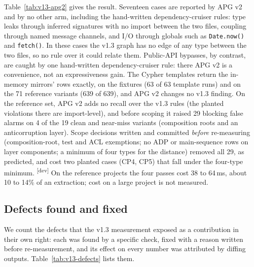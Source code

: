 \documentclass[10pt,a4paper]{article}
\newcommand{\devset}{\textsuperscript{\textsf{\tiny[dev]}}}
\newcommand{\dc}{dependency-cruiser}
\begin{document}
Table~\ref{tab:v13-apg2} gives the result. Seventeen cases are reported by APG v2 and by no other arm, including
the hand-written \dc{} rules: type leaks through inferred signatures with no import between the two files, coupling
through named message channels, and I/O through globals such as \texttt{Date.now()} and \texttt{fetch()}. In these
cases the v1.3 graph has no edge of any type between the two files, so no rule over it could relate them. Public-API
bypasses, by contrast, are caught by one hand-written \dc{} rule: there APG v2 is a convenience, not an
expressiveness gain. %
The Cypher templates return the in-memory mirrors' rows exactly, on the fixtures (63 of 63 template runs) and on
the 71 reference variants (639 of 639), and APG v2 changes no v1.3 finding. %
On the reference set, APG v2 adds no recall over the v1.3 rules (the planted violations there are import-level), and
before scoping it raised 29 blocking false alarms on 4 of the 19 clean and near-miss variants (composition roots and
an anticorruption layer). Scope decisions written and committed \emph{before} re-measuring (composition-root, test
and ACL exemptions; no ADP or main-sequence rows on layer components; a minimum of four types for the distance)
removed all 29, as predicted, and cost two planted cases (CP4, CP5) that fall under the four-type minimum.
\devset{} %
On the reference projects the four passes cost 38 to 64\,ms, about 10 to 14\% of an extraction; cost on a large
project is not measured. %

\subsection{Defects found and fixed}\label{sec:v13-defects}

We count the defects that the v1.3 measurement exposed as a contribution in their own right: each was found by a
specific check, fixed with a reason written before re-measurement, and its effect on every number was attributed by
diffing outputs. Table~\ref{tab:v13-defects} lists them. %
\end{document}
